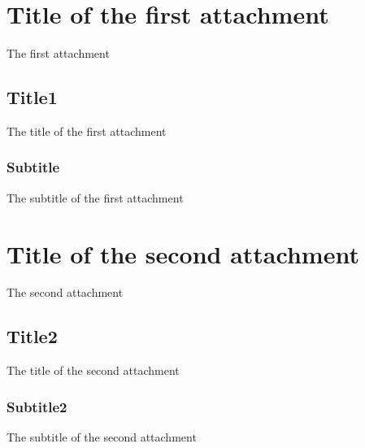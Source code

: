 \chapter{Title of the first attachment}
\label{cha:attach1}
\vspace{0.4 cm}

The first attachment


\section{Title1}
\label{cha:title1}
\vspace{0.2 cm}

The title of the first attachment


\vspace{0.1 cm}
\subsection{Subtitle}
\label{cha:subtitle1}
\vspace{0.1 cm}

The subtitle of the first attachment


\chapter{Title of the second attachment}
\label{cha:attach2}
\vspace{0.4 cm}

The second attachment


\section{Title2}
\label{cha:title2}
\vspace{0.2 cm}

The title of the second attachment


\vspace{0.1 cm}
\subsection{Subtitle2}
\label{cha:subtitle2}
\vspace{0.1 cm}

The subtitle of the second attachment
